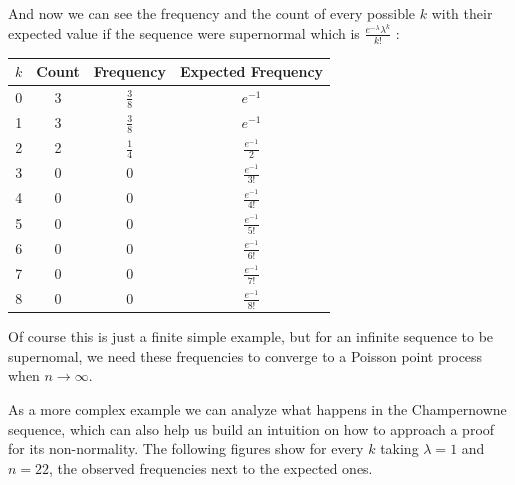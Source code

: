 \documentclass[11pt,a4paper]{tesis}
\theoremstyle{definition}
\begin{document}
And now we can see the frequency and the count of every possible $k$ with their expected value if the sequence were supernormal which is $\frac{e^{-\lambda}\lambda^k}{k!}$ :

\begin{center}
    \begin{tabular}{|c | c |  c| c |} 
    \hline
    $k$ & Count &  Frequency & Expected Frequency \\ [0.1ex] 
    \hline
    0 & 3 & $\frac{3}{8}$ & $e^{-1} $ \\ [0.5ex] 
    \hline
    1 & 3 &$\frac{3}{8}$ & $e^{-1} $ \\  [0.5ex] 
    \hline
    2 & 2 &$\frac{1}{4}$ & $\frac{e^{-1}}{2} $ \\  [0.5ex] 
    \hline
    3 & 0 & 0 & $\frac{e^{-1}}{3!} $ \\  [0.5ex] 
    \hline
    4 & 0 & 0 & $\frac{e^{-1}}{4!} $ \\ [0.5ex] 
    \hline
    5 & 0 & 0 & $\frac{e^{-1}}{5!} $ \\ [0.5ex] 
    \hline
    6 & 0 & 0  & $\frac{e^{-1}}{6!} $ \\ [0.5ex] 
    \hline
    7 & 0 & 0 & $\frac{e^{-1}}{7!} $ \\ [0.5ex] 
    \hline
    8 & 0 & 0 & $\frac{e^{-1}}{8!} $ \\  [0.5ex] 
    \hline
   \end{tabular}
\end{center}

Of course this is just a finite simple example, but for an infinite sequence to be supernomal, we need these frequencies to converge to a Poisson point process when $n \rightarrow \infty$. 

As a more complex example we can analyze what happens in the Champernowne sequence, which can also help us build an intuition on how to approach a proof for its non-normality.
The following figures show for every $k$ taking $\lambda = 1$ and $n = 22$, the observed frequencies next to the expected ones.

\end{document}
